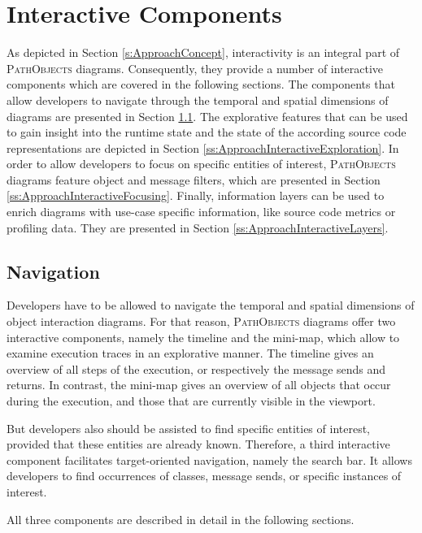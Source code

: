 \section{Interactive Components}
\label{s:ApproachInteractivity}
As depicted in Section \ref{s:ApproachConcept}, interactivity is an integral part of \textsc{PathObjects} diagrams.
Consequently, they provide a number of interactive components which are covered in the following sections.
The components that allow developers to navigate through the temporal and spatial dimensions of diagrams are presented in Section \ref{ss:ApproachInteractiveNavigation}.
The explorative features that can be used to gain insight into the runtime state and the state of the according source code representations are depicted in Section \ref{ss:ApproachInteractiveExploration}.
In order to allow developers to focus on specific entities of interest, \textsc{PathObjects} diagrams feature object and message filters, which are presented in Section \ref{ss:ApproachInteractiveFocusing}.
Finally, information layers can be used to enrich diagrams with use-case specific information, like source code metrics or profiling data.
They are presented in Section \ref{ss:ApproachInteractiveLayers}.

\subsection{Navigation}
\label{ss:ApproachInteractiveNavigation}
Developers have to be allowed to navigate the temporal and spatial dimensions of object interaction diagrams.
For that reason, \textsc{PathObjects} diagrams offer two interactive components, namely the timeline and the mini-map, which allow to examine execution traces in an explorative manner.
The timeline gives an overview of all steps of the execution, or respectively the message sends and returns.
In contrast, the mini-map gives an overview of all objects that occur during the execution, and those that are currently visible in the viewport.

But developers also should be assisted to find specific entities of interest, provided that these entities are already known.
Therefore, a third interactive component facilitates target-oriented navigation, namely the search bar.
It allows developers to find occurrences of classes, message sends, or specific instances of interest.

All three components are described in detail in the following sections.


